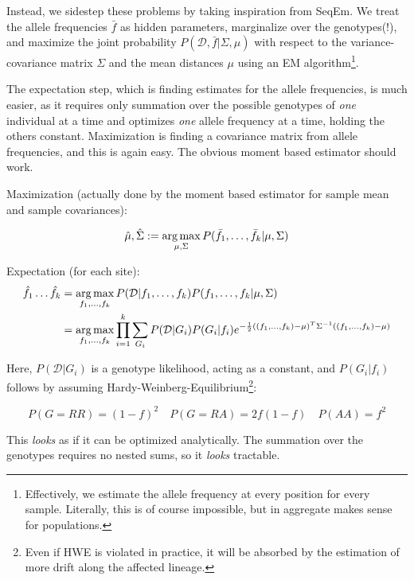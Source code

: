 \documentclass{article}
\newcommand{\argmax}{\operatornamewithlimits{arg\,max}}
\begin{document}
Instead, we sidestep these problems by taking inspiration from
SeqEm\cite{seqem}.  We treat the allele frequencies $\bar{f}$ as
hidden parameters, marginalize over the genotypes(!), and maximize the
joint probability $P(\mathcal{D}, \bar{f} | \Sigma, \mu)$ with
respect to the variance-covariance matrix $\Sigma$ and the mean
distances $\mu$ using an EM algorithm\footnote{Effectively, we estimate
the allele frequency at every position for every sample.  Literally,
this is of course impossible, but in aggregate makes sense for
populations.}.

The expectation step, which is finding estimates for the allele
frequencies, is much easier, as it requires only summation over the
possible genotypes of \emph{one} individual at a time and optimizes
\emph{one} allele frequency at a time, holding the others
constant.  Maximization is finding a covariance
matrix from allele frequencies, and this is again easy.  The obvious
moment based estimator should work.

Maximization (actually done by the moment based estimator for sample
mean and sample covariances):

\begin{equation*}
\hat{\mu}, \hat{\Sigma} := \argmax_{\mu,\Sigma} 
    P(\bar{f}_1,\ldots,\bar{f}_k| \mu,\Sigma)
\end{equation*}

Expectation (for each site):
\begin{align*}
\hat{f_1} \ldots \hat{f_k} &= \argmax_{f_1,\ldots,f_k}
    P(\mathcal{D} | f_1,\ldots,f_k) P(f_1,\ldots,f_k | \mu, \Sigma)  \\
    &=  \argmax_{f_1,\ldots,f_k}
    \prod_{i=1}^k \sum_{G_i} P(\mathcal{D} | G_i) P( G_i | f_i ) 
    e^{ -\frac{1}{2} ((f_1,\ldots,f_k) - \mu)^T \Sigma^{-1} ((f_1,\ldots,f_k) - \mu) }
\end{align*}

Here, $P(\mathcal{D}|G_i)$ is a genotype likelihood, acting as a
constant, and $P( G_i | f_i)$ follows by assuming
Hardy-Weinberg-Equilibrium\footnote{Even if HWE is violated in practice,
it will be absorbed by the estimation of more drift along the affected
lineage.}:

\begin{equation*}
P(G=RR) = (1-f)^2 \quad P(G=RA) = 2f(1-f) \quad P(AA) = f^2
\end{equation*}

This \emph{looks} as if it can be optimized analytically.  The summation
over the genotypes requires no nested sums, so it \emph{looks} tractable.
\end{document}
